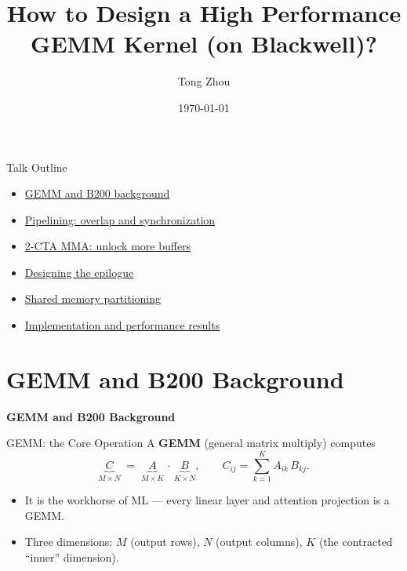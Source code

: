 \documentclass[aspectratio=169,professionalfonts]{beamer}
\title{How to Design a High Performance GEMM Kernel (on Blackwell)?}
\author{Tong Zhou}
\institute{Meshy MLSys Group}
\date{\today}
\newcommand{\sectionslide}[2]{%
  \begin{frame}[plain]
    \begin{center}
      \vspace{1.8cm}
      \hypertarget{#1}{}%
      {\usebeamercolor[fg]{title}\Large\bfseries #2}
    \end{center}
  \end{frame}%
}
\begin{document}
\begin{frame}
  \titlepage
\end{frame}

\begin{frame}{Talk Outline}
  \begin{itemize}
    \item \hyperlink{toc:bg}{GEMM and B200 background}
    \item \hyperlink{toc:pipe}{Pipelining: overlap and synchronization}
    \item \hyperlink{toc:cta2}{2-CTA MMA: unlock more buffers}
    \item \hyperlink{toc:epi}{Designing the epilogue}
    \item \hyperlink{toc:tiles}{Shared memory partitioning}
    \item \hyperlink{toc:impl}{Implementation and performance results}
  \end{itemize}
\end{frame}

\section{GEMM and B200 Background}
\sectionslide{toc:bg}{GEMM and B200 Background}

\begin{frame}{GEMM: the Core Operation}
  A \textbf{GEMM} (general matrix multiply) computes
  \[
    \underbrace{C}_{M\times N} \;=\; \underbrace{A}_{M\times K}\,\cdot\,
    \underbrace{B}_{K\times N},
    \qquad C_{ij} = \sum_{k=1}^{K} A_{ik}\,B_{kj}.
  \]
  \begin{itemize}
    \item It is the workhorse of ML --- every linear layer and attention
      projection is a GEMM.
    \item Three dimensions: \textbf{$M$} (output rows), \textbf{$N$} (output columns),
      \textbf{$K$} (the contracted ``inner'' dimension).
  \end{itemize}
\end{frame}
\end{document}
